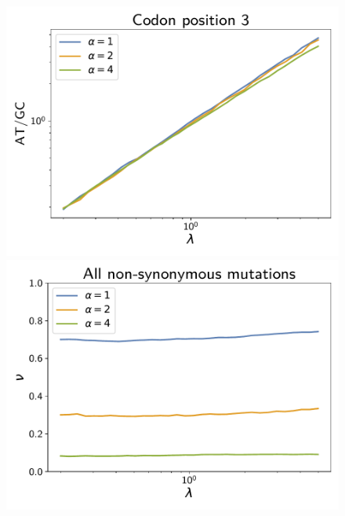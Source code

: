 \documentclass{article}
\begin{document}
\begin{figure}[h]
\begin{minipage}{0.32\linewidth}
        \includegraphics[width=\linewidth, page=1]{simulations/at_over_gc_3}
    \end{minipage}
    \hfill
    \begin{minipage}{0.32\linewidth}
        \includegraphics[width=\linewidth, page=1]{simulations/omega}
    \end{minipage}
    \hfill
    \begin{minipage}{0.32\linewidth}

\end{minipage}
\end{figure}
\end{document}

